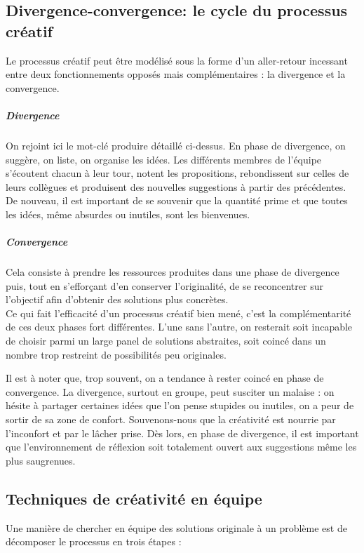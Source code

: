 \subsection{Divergence-convergence: le cycle du processus créatif}

Le processus créatif peut être modélisé sous la forme d'un aller-retour incessant entre deux fonctionnements opposés mais complémentaires : la divergence et la convergence.

\subparagraph{Divergence} On rejoint ici le mot-clé \og{}produire\fg{} détaillé ci-dessus. En phase de divergence, on suggère, on liste, on organise les idées. Les différents membres de l'équipe s'écoutent chacun à leur tour, notent les propositions, rebondissent sur celles de leurs collègues et produisent des nouvelles suggestions à partir des précédentes. De nouveau, il est important de se souvenir que la quantité prime et que toutes les idées, même absurdes ou inutiles, sont les bienvenues.
\subparagraph{Convergence} Cela consiste à prendre les ressources produites dans une phase de divergence puis, tout en s'efforçant d'en conserver l'originalité, de se reconcentrer sur l'objectif afin d'obtenir des solutions plus concrètes.\\[0.4em]

Ce qui fait l'efficacité d'un processus créatif bien mené, c'est la complémentarité de ces deux phases fort différentes. L'une sans l'autre, on resterait soit incapable de choisir parmi un large panel de solutions abstraites, soit coincé dans un nombre trop restreint de possibilités peu originales.

Il est à noter que, trop souvent, on a tendance à rester coincé en phase de convergence. La divergence, surtout en groupe, peut susciter un malaise : on hésite à partager certaines idées que l'on pense stupides ou inutiles, on a peur de sortir de sa zone de confort. Souvenons-nous que la créativité est nourrie par l'inconfort et par le lâcher prise. Dès lors, en phase de divergence, il est important que l'environnement de réflexion soit totalement ouvert aux suggestions même les plus saugrenues.

\subsection{Techniques de créativité en équipe}

Une manière de chercher en équipe des solutions originale à un problème est de décomposer le processus en trois étapes :

